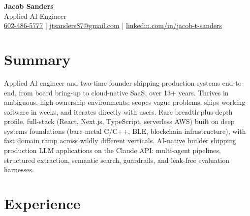 \documentclass[10.5pt, letterpaper]{article}
\begin{document}
\begin{center}
  {\fontsize{28}{32}\selectfont\bfseries\color{accent} Jacob Sanders}\\[5pt]
  {\large\color{muted} Applied AI Engineer}\\[8pt]
  \small
  \faPhone\enspace \href{tel:6024865777}{602-486-5777}
  \enspace\textcolor{accent}{|}\enspace
  \faEnvelope\enspace \href{mailto:jtsanders87@gmail.com}{jtsanders87@gmail.com}
  \enspace\textcolor{accent}{|}\enspace
  \faLinkedin\enspace \href{https://linkedin.com/in/jacob-t-sanders}{linkedin.com/in/jacob-t-sanders}
\end{center}

\vspace{2pt}

\section{Summary}

Applied AI engineer and two-time founder shipping production
systems end-to-end, from board bring-up to cloud-native SaaS, over 13+ years.
Thrives in ambiguous, high-ownership environments: scopes vague problems, ships
working software in weeks, and iterates directly with users. Rare
breadth-plus-depth profile, full-stack (React, Next.js, TypeScript, serverless AWS)
built on deep systems foundations (bare-metal C/C++, BLE, blockchain
infrastructure), with fast domain ramp across wildly different verticals.
AI-native builder shipping production LLM applications on the Claude API:
multi-agent pipelines, structured extraction, semantic search, guardrails, and
leak-free evaluation harnesses.

\section{Experience}
\end{document}
